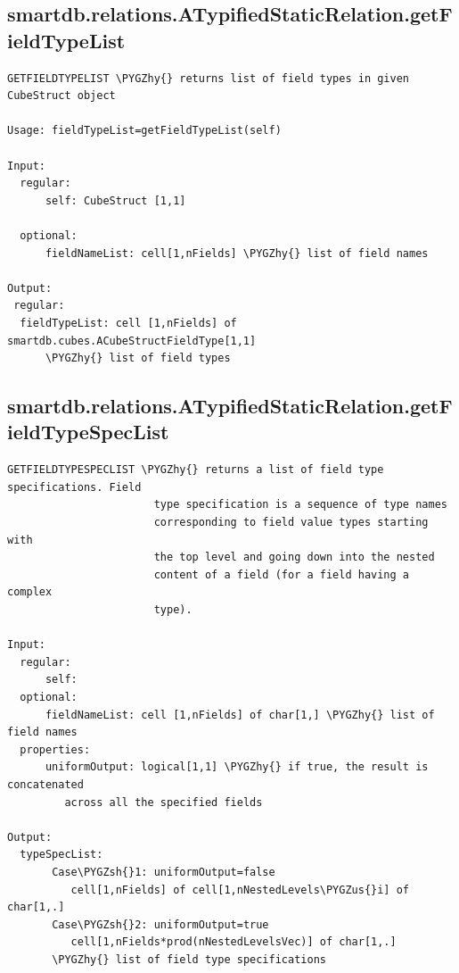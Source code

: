\documentclass[letterpaper,10pt,english]{sphinxmanual}
\def\PYGZus{\char`\_}
\def\PYGZsh{\char`\#}
\def\PYGZhy{\char`\-}
\begin{document}
\subsection{smartdb.relations.ATypifiedStaticRelation.getFieldTypeList}
\label{chap_functions:smartdb-relations-atypifiedstaticrelation-getfieldtypelist}
\begin{Verbatim}[commandchars=\\\{\}]
GETFIELDTYPELIST \PYGZhy{} returns list of field types in given CubeStruct object

Usage: fieldTypeList=getFieldTypeList(self)

Input:
  regular:
      self: CubeStruct [1,1]

  optional:
      fieldNameList: cell[1,nFields] \PYGZhy{} list of field names

Output:
 regular:
  fieldTypeList: cell [1,nFields] of smartdb.cubes.ACubeStructFieldType[1,1]
      \PYGZhy{} list of field types
\end{Verbatim}


\subsection{smartdb.relations.ATypifiedStaticRelation.getFieldTypeSpecList}
\label{chap_functions:smartdb-relations-atypifiedstaticrelation-getfieldtypespeclist}
\begin{Verbatim}[commandchars=\\\{\}]
GETFIELDTYPESPECLIST \PYGZhy{} returns a list of field type specifications. Field
                       type specification is a sequence of type names
                       corresponding to field value types starting with
                       the top level and going down into the nested
                       content of a field (for a field having a complex
                       type).

Input:
  regular:
      self:
  optional:
      fieldNameList: cell [1,nFields] of char[1,] \PYGZhy{} list of field names
  properties:
      uniformOutput: logical[1,1] \PYGZhy{} if true, the result is concatenated
         across all the specified fields

Output:
  typeSpecList:
       Case\PYGZsh{}1: uniformOutput=false
          cell[1,nFields] of cell[1,nNestedLevels\PYGZus{}i] of char[1,.]
       Case\PYGZsh{}2: uniformOutput=true
          cell[1,nFields*prod(nNestedLevelsVec)] of char[1,.]
       \PYGZhy{} list of field type specifications
\end{Verbatim}
\end{document}
